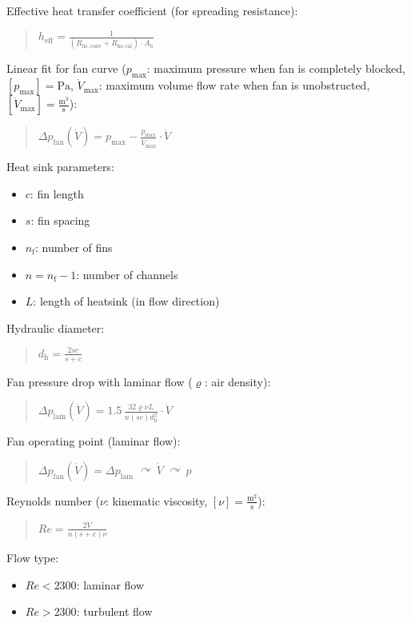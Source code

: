 \documentclass[fontsize=9pt,a4paper,twocolumn]{scrartcl}
\begin{document}
Effective heat transfer coefficient (for spreading resistance):
\begin{quote}
	$h_\mathrm{eff} = \frac{1}{\left(R_{\mathrm{hs},\mathrm{conv}} + R_{\mathrm{hs},\mathrm{cal}}\right)\cdot A_\mathrm{b}}$
\end{quote}

Linear fit for fan curve ($p_\mathrm{max}$: maximum pressure when fan is completely blocked, $[p_\mathrm{max}]=\mathrm{Pa}$, $\dot V_\mathrm{max}$: maximum volume flow rate when fan is unobstructed, $[\dot V_\mathrm{max}]=\frac{\mathrm{m}^3}{\mathrm{s}}$):
\begin{quote}
	$\Delta p_\mathrm{fan}\left(\dot V\right) = p_\mathrm{max} - \frac{p_\mathrm{max}}{\dot V_\mathrm{max}}\cdot \dot V$
\end{quote}

Heat sink parameters:
\begin{itemize}
	\item $c$: fin length
	\item $s$: fin spacing
	\item $n_\mathrm{f}$: number of fins
	\item $n=n_\mathrm{f}-1$: number of channels
	\item $L$: length of heatsink (in flow direction)
\end{itemize}

Hydraulic diameter:
\begin{quote}
	$d_\mathrm{h} = \frac{2 sc}{s+c}$
\end{quote}

Fan pressure drop with laminar flow ($\varrho$: air density):
\begin{quote}
	$\Delta p_\mathrm{lam}\left(\dot V\right) = 1.5\, \frac{32 \varrho \nu L}{n(sc) d_\mathrm{h}^2}\cdot \dot V$
\end{quote}

Fan operating point (laminar flow):
\begin{quote}
	$\Delta p_\mathrm{fan}\left(\dot V\right) = \Delta p_\mathrm{lam}\,\,\curvearrowright\, \dot V\,\,\curvearrowright\,p$
\end{quote}

Reynolds number ($\nu$: kinematic viscosity, $[\nu]=\frac{\mathrm{m}^2}{\mathrm{s}}$):
\begin{quote}
	$Re = \frac{2 \dot V}{n(s+c)\nu}$
\end{quote}
\newpage
Flow type:
\begin{itemize}
	\item $Re<2300$: laminar flow
	\item $Re>2300$: turbulent flow
\end{itemize}
\end{document}

